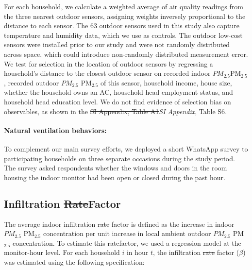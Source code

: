 \documentclass[reqno,12pt,notitlepage]{article}
\providecommand{\DIFadd}[1]{{\protect\color{BLUE}#1}} %
\providecommand{\DIFdel}[1]{{\protect\color{red}\sout{#1}}} %
\providecommand{\DIFaddbegin}{} %
\providecommand{\DIFaddend}{} %
\providecommand{\DIFdelbegin}{} %
\providecommand{\DIFdelend}{} %
\begin{document}
\DIFaddend For each household, we calculate a weighted average of air quality readings from the three nearest outdoor sensors, assigning weights inversely proportional to the distance to each sensor. The 63 outdoor sensors used in this study also capture temperature and humidity data, which we use as controls. The outdoor low-cost sensors were installed prior to our study and were not randomly distributed across space, which could introduce non-randomly distributed measurement error. We test for selection in the location of outdoor sensors by regressing a household's distance to the closest outdoor sensor on recorded indoor \DIFdelbegin \DIFdel{$PM_{2.5}$}\DIFdelend \DIFaddbegin \DIFadd{PM$_{2.5}$}\DIFaddend , recorded outdoor \DIFdelbegin \DIFdel{$PM_{2.5}$ }\DIFdelend \DIFaddbegin \DIFadd{PM$_{2.5}$ }\DIFaddend of this sensor, household income, house size, whether the household owns an AC, household head employment status, and household head education level. We do not find evidence of selection bias on observables, as shown in the \DIFdelbegin \DIFdel{SI Appendix, Table A1}\DIFdelend \DIFaddbegin \DIFadd{\textit{SI Appendix}, Table S6}\DIFaddend .


\paragraph{Natural ventilation behaviors:} To complement our main survey efforts, we deployed a short WhatsApp survey to participating households on three separate occasions during the study period. The survey asked respondents whether the windows and doors in the room housing the indoor monitor had been open or closed during the past hour.


\subsection{Infiltration \DIFdelbegin \DIFdel{Rate}\DIFdelend \DIFaddbegin \DIFadd{Factor}\DIFaddend }

The average indoor infiltration \DIFdelbegin \DIFdel{rate }\DIFdelend \DIFaddbegin \DIFadd{factor }\DIFaddend is defined as the increase in indoor \DIFdelbegin \DIFdel{$PM_{2.5}$ }\DIFdelend \DIFaddbegin \DIFadd{PM$_{2.5}$ }\DIFaddend concentration per unit increase in local ambient outdoor \DIFdelbegin \DIFdel{$PM_{2.5}$ }\DIFdelend \DIFaddbegin \DIFadd{PM$_{2.5}$ }\DIFaddend concentration. To estimate this \DIFdelbegin \DIFdel{rate}\DIFdelend \DIFaddbegin \DIFadd{factor}\DIFaddend , we used a regression model at the monitor-hour level. For each household $i$ in hour $t$, the infiltration \DIFdelbegin \DIFdel{rate }\DIFdelend \DIFaddbegin \DIFadd{factor }\DIFaddend ($\beta$) was estimated using the following specification:
\end{document}
